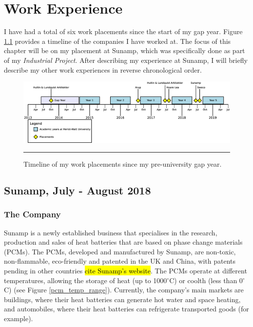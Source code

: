 \chapter{Work Experience} %

\label{Chapter2} %


I have had a total of six work placements since the start of my gap year.
Figure \ref{timeline} provides a timeline of the companies I have worked at.
The focus of this chapter will be on my placement at Sunamp, which was specifically done as part of my \textit{Industrial Project}.
After describing my experience at Sunamp, I will briefly describe my other work experiences in reverse chronological order.

\begin{figure}[htbp]
	\centering
	\includegraphics[width=\textwidth]{figures/IP-Timeline.eps}
	\rule{\textwidth}{0.5pt} %
	\caption{Timeline of my work placements since my pre-university gap year.}
	\label{timeline}
\end{figure}



\section{Sunamp, July - August 2018}

\subsection*{The Company}

Sunamp is a newly established business that specialises in the research, production and sales of heat batteries that are based on phase change materials (PCMs).
The PCMs, developed and manufactured by Sunamp, are non-toxic, non-flammable, eco-friendly and patented in the UK and China, with patents pending in other countries 
\hl{cite Sunamp's website}.
The PCMs operate at different temperatures, allowing the storage of heat (up to 1000$^{\circ}$C) or coolth (less than 0$^{\circ}$C) (see Figure \ref{pcm_temp_range}).
Currently, the company's main markets are buildings, where their heat batteries can generate hot water and space heating, and automobiles, where their heat batteries can refrigerate transported goods (for example).

